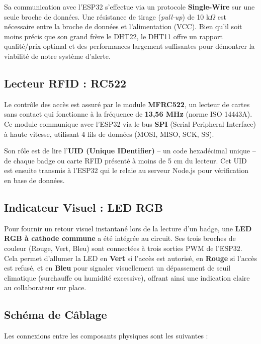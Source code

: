 \documentclass[12pt,a4paper]{report}
\begin{document}
Sa communication avec l'ESP32 s'effectue via un protocole \textbf{Single-Wire} sur une seule broche de données. Une résistance de tirage (\textit{pull-up}) de 10 k$\Omega$ est nécessaire entre la broche de données et l'alimentation (VCC). Bien qu'il soit moins précis que son grand frère le DHT22, le DHT11 offre un rapport qualité/prix optimal et des performances largement suffisantes pour démontrer la viabilité de notre système d'alerte.

\subsection{Lecteur RFID : RC522}
Le contrôle des accès est assuré par le module \textbf{MFRC522}, un lecteur de cartes sans contact qui fonctionne à la fréquence de \textbf{13,56 MHz} (norme ISO 14443A). Ce module communique avec l'ESP32 via le bus \textbf{SPI} (Serial Peripheral Interface) à haute vitesse, utilisant 4 fils de données (MOSI, MISO, SCK, SS).

Son rôle est de lire l'\textbf{UID (Unique IDentifier)} -- un code hexadécimal unique -- de chaque badge ou carte RFID présenté à moins de 5 cm du lecteur. Cet UID est ensuite transmis à l'ESP32 qui le relaie au serveur Node.js pour vérification en base de données.

    \subsection{Indicateur Visuel : LED RGB}
    Pour fournir un retour visuel instantané lors de la lecture d'un badge, une \textbf{LED RGB à cathode commune} a été intégrée au circuit. Ses trois broches de couleur (Rouge, Vert, Bleu) sont connectées à trois sorties PWM de l'ESP32. Cela permet d'allumer la LED en \textbf{Vert} si l'accès est autorisé, en \textbf{Rouge} si l'accès est refusé, et en \textbf{Bleu} pour signaler visuellement un dépassement de seuil climatique (surchauffe ou humidité excessive), offrant ainsi une indication claire au collaborateur sur place.
    
    \subsection{Schéma de Câblage}
    Les connexions entre les composants physiques sont les suivantes :
\end{document}
